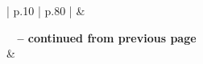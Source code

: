 \begin{center}
    \small
    \begin{longtable}{ | p{} | p{} | }
        \hline 
         &  \\ 
        \hline 
        \endfirsthead

        {{\bfseries \tablename\ \thetable{} -- continued from previous page}} \\
        \hline {} &
         \\  
        \endhead

         \\ 
        \hline
        \endfoot

        \endlastfoot
        

\end{longtable}
\end{center}
